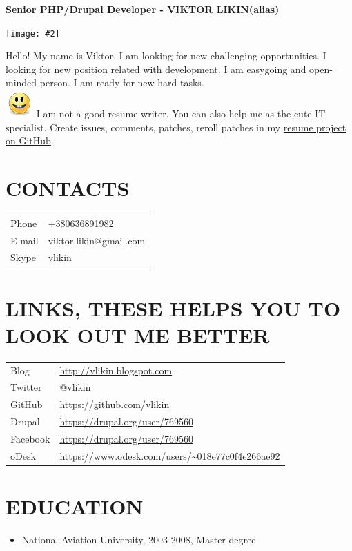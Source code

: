 \documentclass[11pt]{article}
\newcommand{\header}[3]{
	\begin{center} \bfseries \large
		{#1} \\
	\end{center}
	\begin{minipage}{0.3\textwidth}
		\begin{flushleft}
			\texttt{[image: \#2]}
		\end{flushleft}
	\end{minipage}	
	\begin{minipage}{0.7\textwidth}
		\begin{flushleft} \large
			{#3} \\
		\end{flushleft}
	\end{minipage}
}
\begin{document}
	\header
		{Senior PHP/Drupal Developer - VIKTOR LIKIN(alias)}
		{./face.png} 
		{Hello! My name is Viktor. I am looking for new challenging opportunities. I looking for new position related with development. I am easygoing and open-minded person. I am ready for new hard tasks.\\
		\includegraphics[scale=0.7]{./smile.png} I am not a good resume writer. You can also help me as the cute IT specialist. Create issues, comments, patches, reroll patches in my \href{https://github.com/vlikin/resume}{resume project on GitHub}.}
		
		\section*{CONTACTS}
		\begin{tabular}{l l}
			Phone & +380636891982 \\
			E-mail & viktor.likin@gmail.com \\
			Skype & vlikin \\
		\end{tabular}

		\section*{LINKS, THESE HELPS YOU TO LOOK OUT ME BETTER}
		\begin{tabular}{l l}		
			Blog & \url{http://vlikin.blogspot.com} \\
			Twitter & @vlikin \\
			GitHub & \url{https://github.com/vlikin} \\
			Drupal & \url{https://drupal.org/user/769560} \\
			Facebook & \url{https://drupal.org/user/769560} \\
			oDesk & \url{https://www.odesk.com/users/~018e77c0f4e266ae92} \\
		\end{tabular}
		
		\section*{EDUCATION}
		\begin{itemize}
			\item National Aviation University, 2003-2008, Master degree
		\end{itemize}
		
\end{document}
